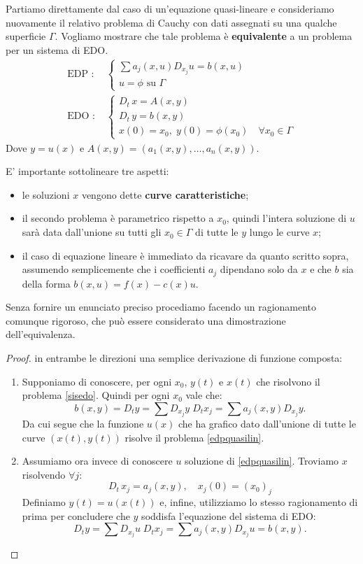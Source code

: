 Partiamo direttamente dal caso di un'equazione quasi-lineare e consideriamo nuovamente il relativo problema di Cauchy con dati assegnati su una qualche superficie $\Gamma$. Vogliamo mostrare che tale problema è \textbf{equivalente} a un problema per un sistema di EDO.
\begin{align} 
\label{edpquasilin}
\text{EDP : }&
\begin{cases}
\sum a_j(x,u)D_{x_j} u = b(x,u)\\
u = \phi \text{ su } \Gamma
\end{cases} \\ 
\label{sisedo}
\text{EDO : }&
\begin{cases}
D_t \, x = A(x,y) \; \\
D_t \, y = b(x,y)\\ 
x(0)=x_0, \; y(0) = \phi (x_0) \quad \forall x_0 \in \Gamma
\end{cases} 
\end{align}
Dove $y = u(x)$ e $A(x,y)=(a_1(x,y),\ldots ,a_n(x,y))$.
\begin{remark}
E' importante sottolineare tre aspetti:
\begin{itemize}
\item le soluzioni $x$ vengono dette \textbf{curve caratteristiche};
\item il secondo problema è parametrico rispetto a $x_0$, quindi l'intera soluzione di $u$ sarà data dall'unione su tutti gli $x_0\in \Gamma$ di tutte le $y$ lungo le curve $x$;
\item il caso di equazione lineare è immediato da ricavare da quanto scritto sopra, assumendo semplicemente che i coefficienti $a_j$ dipendano solo da $x$ e che $b$ sia della forma $b(x,u)=f(x)-c(x)u$.
\end{itemize}
\end{remark}
Senza fornire un enunciato preciso procediamo facendo un ragionamento comunque rigoroso, che può essere considerato una dimostrazione dell'equivalenza.
\begin{proof}
in entrambe le direzioni una semplice derivazione di funzione composta:
\begin{enumerate}
\item Supponiamo di conoscere, per ogni $x_0$, $y(t)$ e $x(t)$ che risolvono il problema \eqref{sisedo}. Quindi per ogni $x_0$ vale che:
$$b(x,y) = D_t y = \sum D_{x_j} y \; D_t x_j = \sum a_j(x,y) D_{x_j} y.$$
Da cui segue che la funzione $u(x)$ che ha grafico dato dall'unione di tutte le curve $(x(t),y(t))$ risolve il problema \eqref{edpquasilin}.
\item Assumiamo ora invece di conoscere $u$ soluzione di \eqref{edpquasilin}. Troviamo $x$ risolvendo $\forall j$:
\begin{equation*} \label{sys}
D_t \, x_j = a_j(x,y), \quad x_j(0)=(x_0)_j 
\end{equation*}
Definiamo $y(t)=u(x(t))$ e, infine, utilizziamo lo stesso ragionamento di prima per concludere che $y$ soddisfa l'equazione del sistema di EDO:
$$D_t y = \sum D_{x_j} u \; D_t x_j = \sum  a_j(x,y)D_{x_j} u = b(x,y).$$
\qedhere
\end{enumerate}
\end{proof}
